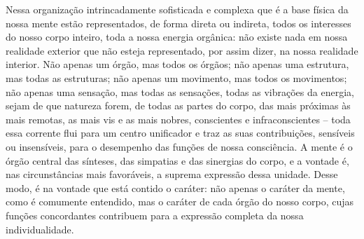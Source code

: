 \clearpage

Nessa organização intrincadamente sofisticada e complexa que é a base
física da nossa mente estão representados, de forma direta ou indireta,
todos os interesses do nosso corpo inteiro, toda a nossa energia
orgânica: não existe nada em nossa realidade exterior que não esteja
representado, por assim dizer, na nossa realidade interior.  Não apenas
um órgão, mas todos os órgãos; não apenas uma estrutura, mas todas as
estruturas; não apenas um movimento, mas todos os movimentos; não
apenas uma sensação, mas todas as sensações, todas as vibrações da
energia, sejam de que natureza forem, de todas as partes do corpo, das
mais próximas às mais remotas, as mais vis e as mais nobres,
conscientes e infraconscientes -- toda essa corrente flui para um centro
unificador e traz as suas contribuições, sensíveis ou insensíveis,
para o desempenho das funções de nossa consciência.  A mente é o órgão
central das sínteses, das simpatias e das sinergias do corpo, e a
vontade é, nas circunstâncias mais favoráveis, a suprema expressão
dessa unidade.  Desse modo, é na vontade que está contido o caráter:
não apenas o caráter da mente, como é comumente entendido, mas o
caráter de cada órgão do nosso corpo, cujas funções concordantes
contribuem para a expressão completa da nossa individualidade.


\bigskip

